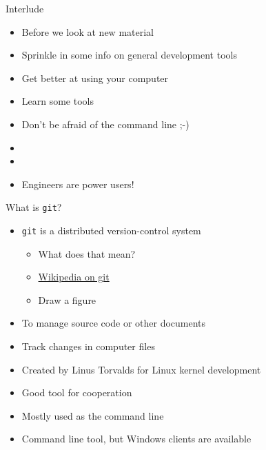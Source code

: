 \documentclass[xcolor=pdflatex,dvipsnames,table]{beamer}
\newcommand{\code}[1]{{\texttt{#1}}}
\begin{document}
\begin{frame}[fragile]{Interlude}
\begin{itemize}
\item Before we look at new material
\item Sprinkle in some info on general development tools
\item Get better at using your computer
\item Learn some tools
\item Don't be afraid of the command line ;-)
\item
\item
\item Engineers are power users!
\end{itemize}
\end{frame}

\begin{frame}[fragile]{What is \code{git}?}
\begin{itemize}
\item \code{git} is a distributed version-control system
\begin{itemize}
\item What does that mean?
\item \href{https://en.wikipedia.org/wiki/Git}{Wikipedia on git}
\item Draw a figure
\end{itemize}
\item To manage source code or other documents
\item Track changes in computer files
\item Created by Linus Torvalds for Linux kernel development
\item Good tool for cooperation
\item Mostly used as the command line
\item Command line tool, but Windows clients are available
\end{itemize}
\end{frame}
\end{document}
